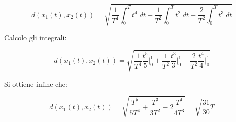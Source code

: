 \documentclass[../main.tex]{subfiles}
\begin{document}
\begin{equation}
	d(x_1(t), x_2(t)) = \sqrt{ \frac{1}{T^4} \int_{0}^{T}  t^4 \;dt + \frac{1}{T^2}\int_{0}^{T} t^2 \;dt - \frac{2}{T^2} \int_{0}^{T}  t^3  \; dt}
\end{equation}

Calcolo gli integrali:

\begin{equation}
	d(x_1(t), x_2(t)) = \sqrt{ \frac{1}{T^4} \frac{t^5}{5} \bigg|_0^1 + \frac{1}{T^2} \frac{t^3}{3} \bigg|_0^1 - \frac{2}{T^2} \frac{t^4}{4} \bigg|_0^1}
\end{equation}

Si ottiene infine che:

\begin{equation}
	d(x_1(t), x_2(t)) = \sqrt{ \frac{T^5}{ 5 T^4}  + \frac{T^3}{3 T^2} -2 \frac{T^4}{4 T^3}} = \sqrt{\frac{31}{30}T}
\end{equation}




 
\end{document}

